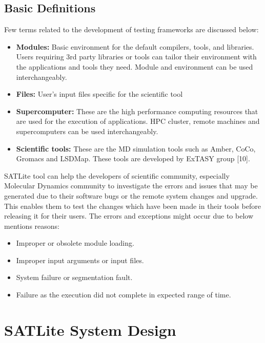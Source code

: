 \documentclass[10pt]{ruthesis}
\begin{document}
\subsection{Basic Definitions}
Few terms related to the development of testing frameworks are discussed below:
\begin{itemize}
\item \textbf{Modules:} Basic environment for the default compilers, tools, and libraries. Users requiring 3rd party libraries or tools can tailor their  environment with the applications and tools they need. Module and environment can be used interchangeably.

\item \textbf{Files:} User's input files specific for the scientific tool

\item \textbf{Supercomputer:} These are the high performance computing resources that are used for the execution of applications. HPC cluster, remote machines and supercomputers can be used interchangeably.

\item \textbf{Scientific tools:} These are the MD simulation tools such as Amber, CoCo, Gromacs and LSDMap. These tools are developed by ExTASY group [10].
\end{itemize}

SATLite tool can help the developers of scientific community, especially Molecular Dynamics community to investigate the errors and issues that may be generated due to their software bugs or the remote system changes and upgrade. This enables them to test the changes which have been made in their tools before releasing it for their users. The errors and exceptions might occur due to below mentions reasons:

\begin{itemize}
\item Improper or obsolete module loading.
\item Improper input arguments or input files.
\item System failure or segmentation fault.
\item Failure as the execution did not complete in expected range of time.
\end{itemize}

\section{SATLite System Design}
\end{document}
